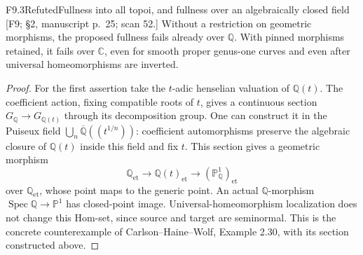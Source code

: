 \begin{result}{F9.3}{Refuted}{Fullness into all topoi, and fullness over an algebraically closed field}
\textup{[F9; \S2, manuscript p.\ 25; scan 52.]}
Without a restriction on geometric morphisms, the proposed fullness
fails already over $\mathbb Q$. With pinned morphisms retained, it
fails over $\mathbb C$, even for smooth proper genus-one curves and
even after universal homeomorphisms are inverted.
\end{result}

\begin{proof}
For the first assertion take the $t$-adic henselian valuation of
$\mathbb Q(t)$. The coefficient action, fixing compatible roots of
$t$, gives a continuous section $G_{\mathbb Q}\to G_{\mathbb Q(t)}$
through its decomposition group. One can construct it in the Puiseux
field $\bigcup_n\overline{\mathbb Q}((t^{1/n}))$: coefficient
automorphisms preserve the algebraic closure of $\mathbb Q(t)$
inside this field and fix $t$. This section gives a geometric morphism
\[
 \mathbb Q_{\mathrm{et}}\longrightarrow
 \mathbb Q(t)_{\mathrm{et}}\longrightarrow
 (\mathbb P^1_{\mathbb Q})_{\mathrm{et}}
\]
over $\mathbb Q_{\mathrm{et}}$, whose point maps to the generic point.
An actual $\mathbb Q$-morphism $\operatorname{Spec}\mathbb Q\to
\mathbb P^1$ has closed-point image. Universal-homeomorphism
localization does not change this Hom-set, since source and target
are seminormal. This is the concrete counterexample of
Carlson--Haine--Wolf, Example 2.30, with its section constructed above.


\end{proof}
